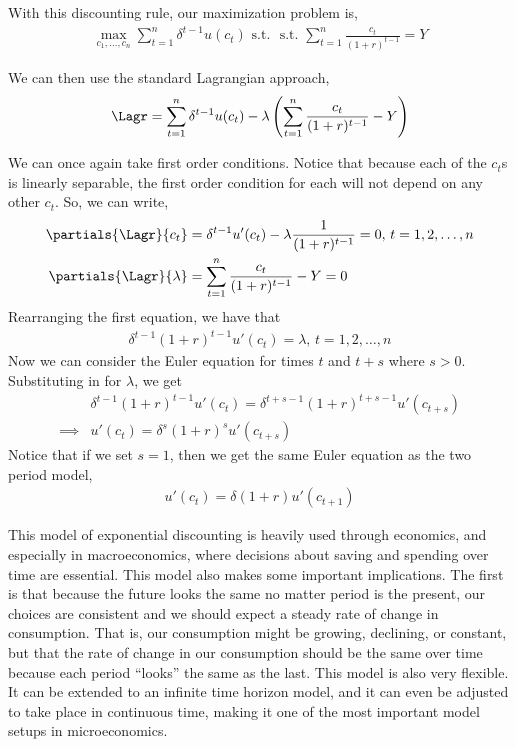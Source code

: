 With this discounting rule, our maximization problem is,
\begin{align*}
    \max_{c_1, \dots, c_n} \sum_{t = 1}^n \delta^{t - 1}u(c_t) \text{ s.t. } \text{ s.t. } \sum_{t = 1}^n \frac{c_t}{(1 + r)^{t - 1}} = Y
\end{align*}

We can then use the standard Lagrangian approach,
\begin{align*}
    \Lagr = \sum_{t = 1}^n \delta^{t - 1}u(c_t) - \lambda \left(\sum_{t = 1}^n \frac{c_t}{(1 + r)^{t - 1}} - Y\right)
\end{align*}

We can once again take first order conditions. Notice that because each of the $c_t$s is linearly separable, the first order condition for each will not depend on any other $c_t$. So, we can write,
\begin{align*}
    \partials{\Lagr}{c_t} &= \delta^{t - 1} u'(c_t) - \lambda \frac{1}{(1 + r)^{t - 1}} = 0, \, t = 1, 2, \dots, n \\
    \partials{\Lagr}{\lambda} &= \sum_{t = 1}^n \frac{c_t}{(1 + r)^{t - 1}} - Y = 0
\end{align*}
Rearranging the first equation, we have that
\begin{align*}
    \delta^{t- 1} (1+ r)^{t - 1} u'(c_t) = \lambda, \, t = 1, 2, \dots, n
\end{align*}
Now we can consider the Euler equation for times $t$ and $t + s$ where $s > 0$. Substituting in for $\lambda$, we get
\begin{align*}
    &\delta^{t - 1} (1+ r)^{t - 1} u'(c_t) = \delta^{t + s - 1} (1 + r)^{t + s - 1} u'(c_{t + s}) \\
    \implies& u'(c_t) = \delta^s (1 + r)^s u'(c_{t + s})
\end{align*}
Notice that if we set $s = 1$, then we get the same Euler equation as the two period model,
\begin{align*}
    u'(c_t) = \delta (1+r)u'(c_{t + 1})
\end{align*}

This model of exponential discounting is heavily used through economics, and especially in macroeconomics, where decisions about saving and spending over time are essential. This model also makes some important implications. The first is that because the future looks the same no matter period is the present, our choices are consistent and we should expect a steady rate of change in consumption. That is, our consumption might be growing, declining, or constant, but that the rate of change in our consumption should be the same over time because each period ``looks'' the same as the last. This model is also very flexible. It can be extended to an infinite time horizon model, and it can even be adjusted to take place in continuous time, making it one of the most important model setups in microeconomics.

